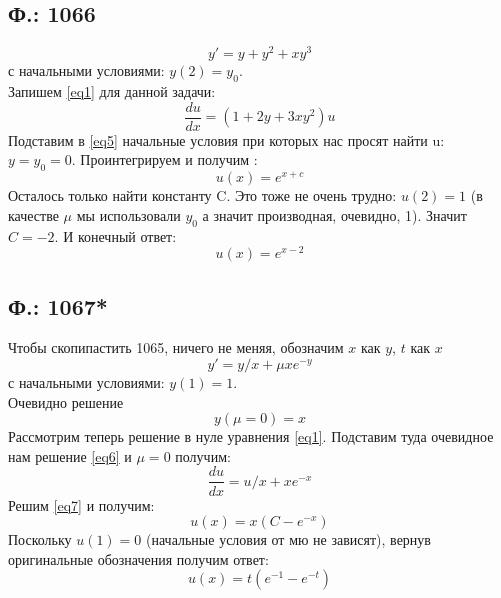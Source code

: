 \documentclass{article}
\begin{document}
\subsection{Ф.: 1066}
\begin{equation}
    y'= y + y^2 +x y^3
\end{equation}
с начальными условиями: $y(2)=y_0$. \\
Запишем \ref{eq1} для данной задачи:
\begin{equation} \label{eq5}
    \frac{d u}{d x}=(1+2 y + 3x y^2)u
\end{equation}
Подставим в \ref{eq5} начальные условия при которых нас просят найти u: $y=y_0=0$. Проинтегрируем и получим :
\begin{equation}
    u(x)=e^{x+c}
\end{equation}
Осталось только найти константу C. Это тоже не очень трудно: $u(2)=1$ (в качестве $\mu$ мы использовали $y_0$ а значит производная, очевидно, 1). Значит $C = -2$. И конечный ответ:
\begin{equation}
u(x)=e^{x-2}
\end{equation}
\subsection{Ф.: 1067*}
Чтобы скопипастить 1065, ничего не меняя, обозначим $x$ как $y$, $t$  как $x$ 
\begin{equation}
    y'=y/x+\mu x e^{-y}
\end{equation}
с начальными условиями: $y(1)=1$. \\
Очевидно решение 
\begin{equation} \label{eq6}
    y(\mu=0)=x
\end{equation} 
Рассмотрим теперь решение в нуле уравнения \ref{eq1}. Подставим туда очевидное нам решение \ref{eq6} и $\mu=0$ получим:
\begin{equation} \label{eq7}
    \frac{d u}{d x} = u/x + x e^{-x}
\end{equation}
Решим \ref{eq7} и получим:
\begin{equation}
    u(x)= x(C - e^{-x})
\end{equation}
Поскольку $u(1)=0$ (начальные условия от мю не зависят), вернув оригинальные обозначения получим ответ:\\
\begin{equation}
    u(x)= t(e^{-1} - e^{-t})
\end{equation}
\end{document}

